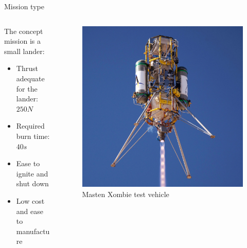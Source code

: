\documentclass{beamer}
\begin{document}
\begin{frame}{Mission type}
    \begin{columns}
        \begin{column}{0.6\textwidth}
        \noindent
        The concept mission is a small lander:
        \begin{itemize}
            \item Thrust adequate for the lander: $250N$
            \item Required burn time: $40s$
            \item Ease to ignite and shut down
            \item Low cost and ease to manufacture
        \end{itemize}
        \end{column}
    
        \begin{column}{0.4\textwidth}
        \begin{figure}[t]
            \centering
            \includegraphics[width=0.9\linewidth]{images/masten-xombie-square.jpg} 
            \caption{Masten Xombie test vehicle}
        \end{figure}
        \end{column}
    \end{columns}
\end{frame}

\end{document}
